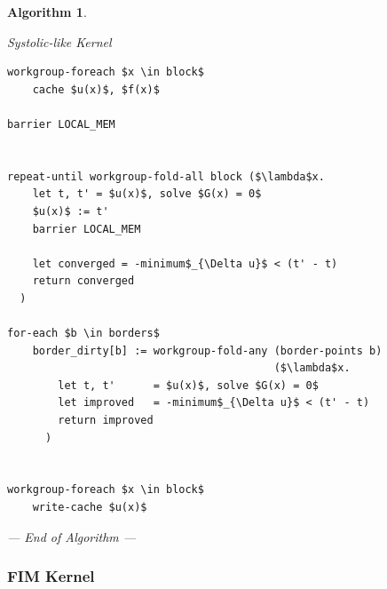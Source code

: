 \documentclass[11pt]{article}       %
\newcommand\clearlines[1]{%
	\if#10\else%
	\leavevmode\\%
	\expandafter\clearlines\expandafter{\the\numexpr#1-1}%
	\fi}
\newtheorem{algX}{Algorithm}
\newenvironment{algorithm}       {\begin{algX}\begin{em}}%
                                 {\par\noindent --- End of Algorithm ---
                                 \end{em}\end{algX}}
\begin{document}
\begin{algorithm}
	\caption{Systolic-like Kernel}
	\label{alg:kernel_systolic}
	\begin{center}
		\footnotesize

		\begin{minipage}{.80\linewidth}

			\begin{lstlisting}[style=code]
workgroup-foreach $x \in block$
    cache $u(x)$, $f(x)$

barrier LOCAL_MEM


repeat-until workgroup-fold-all block ($\lambda$x.
    let t, t' = $u(x)$, solve $G(x) = 0$ 
    $u(x)$ := t'
    barrier LOCAL_MEM
    
    let converged = -minimum$_{\Delta u}$ < (t' - t)
    return converged
  )

for-each $b \in borders$
    border_dirty[b] := workgroup-fold-any (border-points b)
                                          ($\lambda$x.
        let t, t'      = $u(x)$, solve $G(x) = 0$ 
        let improved   = -minimum$_{\Delta u}$ < (t' - t)
        return improved
      )


workgroup-foreach $x \in block$
	write-cache $u(x)$

			\end{lstlisting}
\hfill
		\end{minipage}
	\end{center}
\end{algorithm}
\FloatBarrier
\subsubsection{FIM Kernel}\label{sec:kernel_fim}
\end{document}

